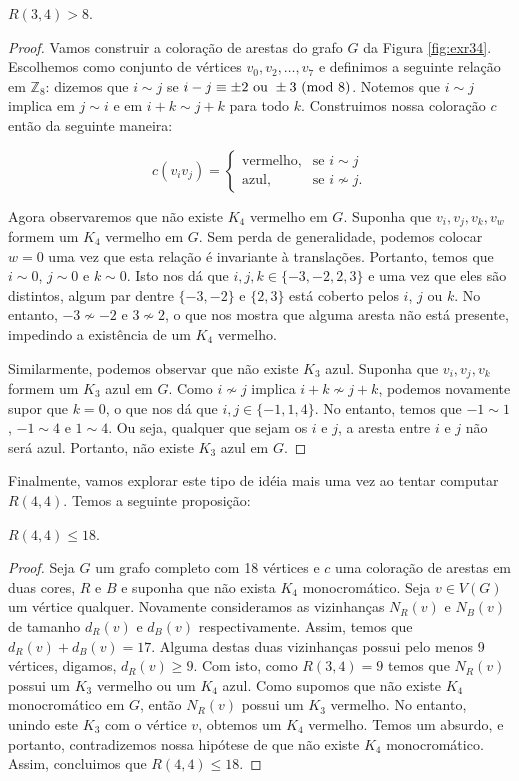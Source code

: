 \begin{proposition}
\label{thm:exr34}
$R(3,4) > 8$.
\end{proposition}
\begin{proof}
Vamos construir a coloração de arestas do grafo $G$ da Figura \ref{fig:exr34}. Escolhemos como conjunto de vértices $v_0, v_2, \dots, v_7$ e definimos a seguinte relação em $\mathbb{Z}_8$: dizemos que $i \sim j$ se $ i - j \equiv \pm 2 \text{ ou } \pm 3 \ (\text{mod}\ 8)$.
Notemos que $i \sim j$ implica em $ j \sim i$ e em $i + k \sim j + k$ para todo $k$. Construimos nossa coloração $c$ então da seguinte maneira:

\[c(v_i v_j) = \begin{cases}
  \text{vermelho}, & \text{se } i \sim j \\
  \text{azul}, & \text{se } i \not\sim j.
\end{cases}\]

Agora observaremos que não existe $K_4$ vermelho em $G$. Suponha que $v_i, v_j, v_k, v_w$ formem um $K_4$ vermelho em $G$. Sem perda de generalidade, podemos colocar $w = 0$ uma vez que esta relação é invariante à translações. Portanto, temos que $i \sim 0$, $j \sim 0$ e $k \sim 0$. Isto nos dá que $i,j,k \in \{-3,-2,2,3\}$ e uma vez que eles são distintos, algum par dentre $\{-3,-2\}$ e $\{2,3\}$ está coberto pelos $i$, $j$ ou $k$.
No entanto, $-3 \not\sim -2$ e $3 \not\sim 2$, o que nos mostra que alguma aresta não está presente, impedindo a existência de um $K_4$ vermelho.

Similarmente, podemos observar que não existe $K_3$ azul. Suponha que $v_i, v_j, v_k$ formem um $K_3$ azul em $G$. Como $i \not\sim j$ implica $i + k \not\sim j + k$, podemos novamente supor que $k = 0$, o que nos dá que $i,j \in \{-1,1,4\}$.
No entanto, temos que $-1 \sim 1$, $-1 \sim 4$ e $1 \sim 4$. Ou seja, qualquer que sejam os $i$ e $j$, a aresta entre $i$ e $j$ não será azul. Portanto, não existe $K_3$ azul em $G$.
\end{proof}

Finalmente, vamos explorar este tipo de idéia mais uma vez ao tentar computar $R(4,4)$. Temos a seguinte proposição:

\begin{theorem}
\label{thm:r44}
$R(4,4) \leq 18$.
\end{theorem}
\begin{proof}
Seja $G$ um grafo completo com 18 vértices e $c$ uma coloração de arestas em duas cores, $R$ e $B$ e suponha que não exista $K_4$ monocromático. Seja $v \in V(G)$ um vértice qualquer. Novamente consideramos as vizinhanças $N_R(v)$ e $N_B(v)$ de tamanho $d_R(v)$ e $d_B(v)$ respectivamente. Assim, temos que $d_R(v) + d_B(v) = 17$. Alguma destas duas vizinhanças possui pelo menos 9 vértices, digamos, $d_R(v) \geq 9$. Com isto, como $R(3,4) = 9$ temos que $N_R(v)$ possui um $K_3$ vermelho ou um $K_4$ azul. Como supomos que não existe $K_4$ monocromático em $G$, então $N_R(v)$ possui um $K_3$ vermelho.
No entanto, unindo este $K_3$ com o vértice $v$, obtemos um $K_4$ vermelho. Temos um absurdo, e portanto, contradizemos nossa hipótese de que não existe $K_4$ monocromático. Assim, concluimos que $R(4,4) \leq 18$.
\end{proof}

